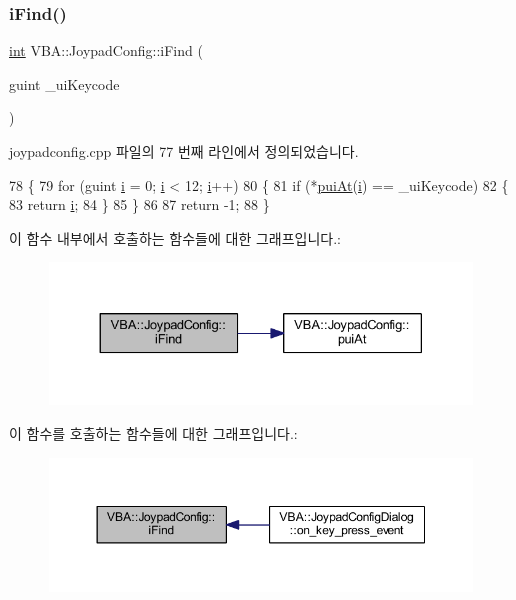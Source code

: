 \subsubsection{\texorpdfstring{i\+Find()}{iFind()}}
{\footnotesize\ttfamily \mbox{\hyperlink{_util_8cpp_a0ef32aa8672df19503a49fab2d0c8071}{int}} V\+B\+A\+::\+Joypad\+Config\+::i\+Find (\begin{DoxyParamCaption}\item[{guint}]{\+\_\+ui\+Keycode }\end{DoxyParamCaption})}



joypadconfig.\+cpp 파일의 77 번째 라인에서 정의되었습니다.


\begin{DoxyCode}
78 \{
79   \textcolor{keywordflow}{for} (guint \mbox{\hyperlink{expr-lex_8cpp_acb559820d9ca11295b4500f179ef6392}{i}} = 0; \mbox{\hyperlink{expr-lex_8cpp_acb559820d9ca11295b4500f179ef6392}{i}} < 12; \mbox{\hyperlink{expr-lex_8cpp_acb559820d9ca11295b4500f179ef6392}{i}}++)
80   \{
81     \textcolor{keywordflow}{if} (*\mbox{\hyperlink{class_v_b_a_1_1_joypad_config_afa304227fa214176c874619365ffc445}{puiAt}}(\mbox{\hyperlink{expr-lex_8cpp_acb559820d9ca11295b4500f179ef6392}{i}}) == \_uiKeycode)
82     \{
83       \textcolor{keywordflow}{return} \mbox{\hyperlink{expr-lex_8cpp_acb559820d9ca11295b4500f179ef6392}{i}};
84     \}
85   \}
86 
87   \textcolor{keywordflow}{return} -1;
88 \}
\end{DoxyCode}
이 함수 내부에서 호출하는 함수들에 대한 그래프입니다.\+:
\nopagebreak
\begin{figure}[H]
\begin{center}
\leavevmode
\includegraphics[width=330pt]{class_v_b_a_1_1_joypad_config_a27d56b77293ce938b1a6437a384d625d_cgraph}
\end{center}
\end{figure}
이 함수를 호출하는 함수들에 대한 그래프입니다.\+:
\nopagebreak
\begin{figure}[H]
\begin{center}
\leavevmode
\includegraphics[width=350pt]{class_v_b_a_1_1_joypad_config_a27d56b77293ce938b1a6437a384d625d_icgraph}
\end{center}
\end{figure}
